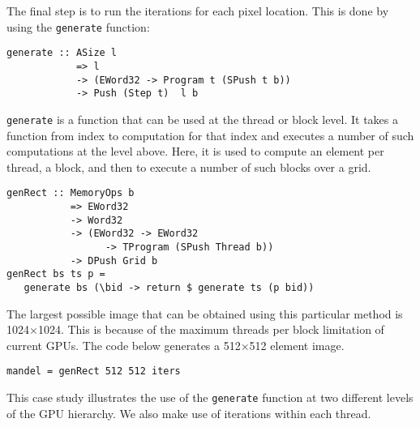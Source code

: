 The final step is to run the iterations for each pixel location. 
This is done by using the {\tt generate} function: 
\begin{small}
\begin{Verbatim}[samepage=true] 
generate :: ASize l
            => l
            -> (EWord32 -> Program t (SPush t b))
            -> Push (Step t)  l b
\end{Verbatim}
\end{small}

\noindent
{\tt generate} is a function that can be used at the thread or block level.
It takes a function from index to computation for that index and executes a 
number of such computations at the level above. Here, it is used to compute 
an element per thread, a block,  and then to execute a number of such blocks over a grid. 


\begin{small} 
\begin{verbatim} 
genRect :: MemoryOps b
           => EWord32
           -> Word32
           -> (EWord32 -> EWord32 
                 -> TProgram (SPush Thread b))
           -> DPush Grid b 
genRect bs ts p = 
   generate bs (\bid -> return $ generate ts (p bid))
\end{verbatim}
\end{small} %


The largest possible image that can be obtained using this particular 
method is 1024$\times$1024. This is because of the maximum threads per block 
limitation of current GPUs. The code below generates a 512$\times$512 element 
image. 
\begin{small} 
\begin{verbatim}
mandel = genRect 512 512 iters 
\end{verbatim}
\end{small}

This case study illustrates the use of the {\tt generate} function at 
two different levels of the GPU hierarchy. We also make use of 
iterations within each thread.

